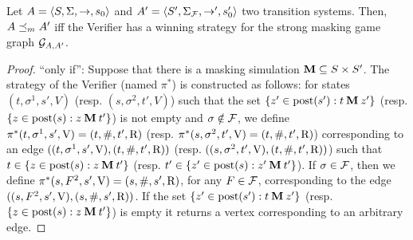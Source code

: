 \begin{thm} \label{thm:wingame_strat}
  Let $A=\langle S, \Sigma, \rightarrow, s_0 \rangle$ and $A'=\langle S', \Sigma_{\mathcal{F}}, \rightarrow', s'_0 \rangle$ two transition systems.
  Then, $A \preceq_{m} A'$ iff the Verifier has a winning strategy for the strong masking game graph $\mathcal{G}_{A, A'}$.
\end{thm}
\begin{proof} 
	``only if'': Suppose that there is a masking simulation $\mathbin{\mathbf{M}} \subseteq S \times S'$.
The strategy of the Verifier (named $\pi^*$) is constructed as follows:  for states $(t, \sigma^1, s', V)$ (resp. $(s, \sigma^2, t', V)$) such that  the set $\{ z' \in \operatorname{post}(s'): t \mathbin{\mathbf{M}} z' \}$
(resp. $\{ z \in \operatorname{post}(s): z \mathbin{\mathbf{M}} t' \}$) is not empty and $\sigma \notin \mathcal{F}$, we define $\pi^*(t, \sigma^1, s', \mathrm{V}) = (t, \#, t', \mathrm{R})$ 
(resp. $\pi^*(s, \sigma^2, t', \mathrm{V}) = (t, \#, t', \mathrm{R})$) corresponding to an edge $((t, \sigma^1, s', \mathrm{V}), (t, \#, t', \mathrm{R}))$ (resp. $((s, \sigma^2, t', \mathrm{V}),(t, \#, t', \mathrm{R}))$) such that $t \in \{ z \in \operatorname{post}(s): z \mathbin{\mathbf{M}} t' \}$ (resp. $t' \in \{ z' \in \operatorname{post}(s): z' \mathbin{\mathbf{M}} t' \}$).  If $\sigma \in \mathcal{F}$, then we define $\pi^*(s, F^2, s', \mathrm{V}) = (s, \#, s', \mathrm{R})$, for any $F \in \mathcal{F}$, corresponding to the edge $((s, F^2, s', \mathrm{V}),( s, \#, s', \mathrm{R}))$. If the set $\{ z' \in \operatorname{post}(s'): t \mathbin{\mathbf{M}} z' \}$  (resp. $\{ z \in \operatorname{post}(s): z \mathbin{\mathbf{M}} t' \}$) 
is empty it returns a vertex corresponding to an arbitrary edge. 


\end{proof}
